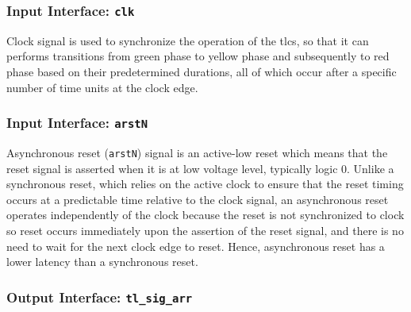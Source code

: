 \subsubsection{Input Interface: \texttt{clk}}
Clock signal is used to synchronize the operation of the \acs{tlcs}, so that it can performs transitions from green phase to yellow phase and subsequently to red phase based on their predetermined durations, all of which occur after a specific number of time units at the clock edge.

\subsubsection{Input Interface: \texttt{arstN}}
Asynchronous reset (\texttt{arstN}) signal is an active-low reset which means that the reset signal is asserted when it is at low voltage level, typically logic 0. Unlike a synchronous reset, which relies on the active clock to ensure that the reset timing occurs at a predictable time relative to the clock signal, an asynchronous reset operates independently of the clock because the reset is not synchronized to clock so reset occurs immediately upon the assertion of the reset signal, and there is no need to wait for the next clock edge to reset. Hence, asynchronous reset has a lower latency than a synchronous reset.

\subsubsection{Output Interface: \texttt{tl\_sig\_arr}}

